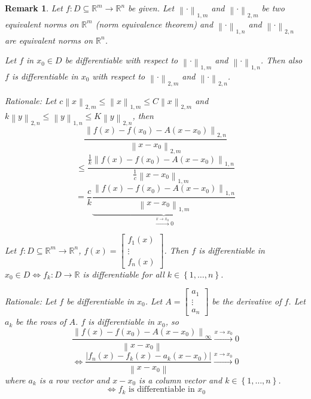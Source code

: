\documentclass{article}
\newtheorem{remark}{Remark}  \numberwithin{remark}{section}
\newcommand{\set}[1]{\left\{#1\right\}}
\newcommand{\norm}[1]{\left\|#1\right\|}
\newcommand{\card}[1]{\left|#1\right|}
\begin{document}
\begin{remark}
  Let $f: D \subseteq \mathbb R^m \to \mathbb R^n$ be given.
  Let $\norm{\cdot}_{1,m}$ and $\norm{\cdot}_{2,m}$ be two equivalent norms on $\mathbb R^m$ (norm equivalence theorem)
  and $\norm{\cdot}_{1,n}$ and $\norm{\cdot}_{2,n}$ are equivalent norms on $\mathbb R^n$.

  Let $f$ in $x_0 \in D$ be differentiable with respect to $\norm{\cdot}_{1,m}$ and $\norm{\cdot}_{1,n}$.
  Then also $f$ is differentiable in $x_0$ with respect to $\norm{\cdot}_{2,m}$ and $\norm{\cdot}_{2,n}$.

  \emph{Rationale:} Let $c \norm{x}_{2,m} \leq \norm{x}_{1,m} \leq C \norm{x}_{2,m}$ and
  $k \norm{y}_{2,n} \leq \norm{y}_{1,n} \leq K \norm{y}_{2,n}$, then
  \[ \frac{\norm{f(x) - f(x_0) - A(x - x_0)}_{2,n}}{\norm{x - x_0}_{2,m}} \]
  \[ \leq \frac{\frac1k \norm{f(x) - f(x_0) - A(x - x_0)}_{1,n}}{\frac1c \norm{x - x_0}_{1,m}} \]
  \[ = \frac ck \underbrace{\frac{\norm{f(x) - f(x_0) - A (x - x_0)}_{1,n}}{\norm{x - x_0}_{1,m}}}_{\xrightarrow{x \to x_0} 0} \]

  Let $f: D \subseteq \mathbb R^m \to \mathbb R^n$, $f(x) = \begin{bmatrix} f_1(x) \\ \vdots \\ f_n(x) \end{bmatrix}$.
  Then $f$ is differentiable in $x_0 \in D \iff f_k: D \to \mathbb R$ is differentiable for all $k \in \set{1, \dots, n}$.
  
  \emph{Rationale:} Let $f$ be differentiable in $x_0$. Let $A = \begin{bmatrix} a_1 \\ \vdots \\ a_n \end{bmatrix}$ be the derivative of $f$.
  Let $a_k$ be the rows of $A$. $f$ is differentiable in $x_0$, so
  \[ \frac{\norm{f(x) - f(x_0) - A(x - x_0)}_{\infty}}{\norm{x - x_0}} \xrightarrow{x \to x_0} 0 \]
  \[ \iff \frac{\card{f_n(x) - f_k(x) - a_k(x - x_0)}}{\norm{x - x_0}} \xrightarrow{x \to x_0} 0 \]
  where $a_k$ is a row vector and $x-x_0$ is a column vector and $k \in \set{1, \dots, n}$.
  \[ \iff f_k \text{ is differentiable in } x_0 \]
\end{remark}
\end{document}
